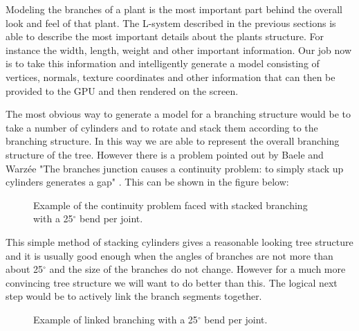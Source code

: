 \begin{flushleft}

Modeling the branches of a plant is the most important part behind the overall look and feel of that plant. The L-system described in the previous sections is able to describe the most important details about the plants structure. For instance the width, length, weight and other important information. Our job now is to take this information and intelligently generate a model consisting of vertices, normals, texture coordinates and other information that can then be provided to the GPU and then rendered on the screen.\\

\vspace{5mm}

The most obvious way to generate a model for a branching structure would be to take a number of cylinders and to rotate and stack them according to the branching structure. In this way we are able to represent the overall branching structure of the tree. However there is a problem pointed out by Baele and Warz\'{e}e "The branches junction causes a continuity problem: to simply stack up cylinders generates a gap" \cite{baele2005real}. This can be shown in the figure below:

\FloatBarrier

\begin{figure}[htbp]
	{\centering
		\vspace{7px}
		\setlength{\fboxrule}{1pt}
		\caption{Example of the continuity problem faced with stacked branching with a 25$^{\circ}$ bend per joint.}
	}
\end{figure}

\FloatBarrier

\vspace{5mm}


\vspace{5mm}

This simple method of stacking cylinders gives a reasonable looking tree structure and it is usually good enough when the angles of branches are not more than about 25$^{\circ}$ and the size of the branches do not change. However for a much more convincing tree structure we will want to do better than this. The logical next step would be to actively link the branch segments together.

\FloatBarrier

\begin{figure}[htbp]
	{\centering
		\vspace{7px}
		\setlength{\fboxrule}{1pt}
		\caption{Example of linked branching with a 25$^{\circ}$ bend per joint.}
	}
\end{figure}

\FloatBarrier

\end{flushleft}

